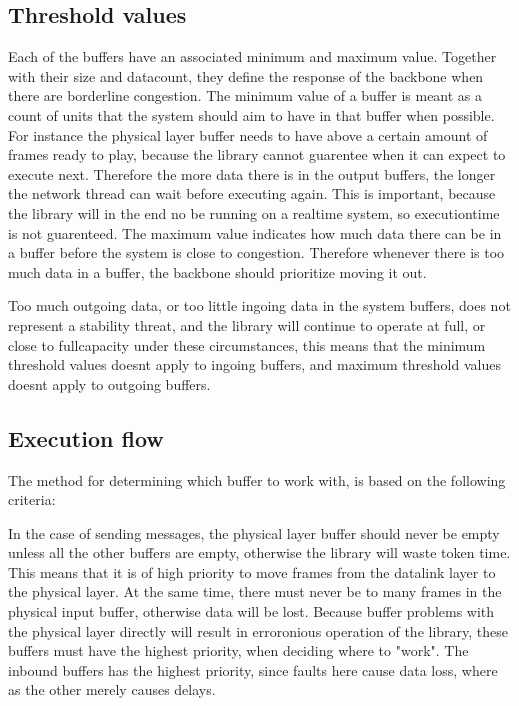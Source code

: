 \subsection{Threshold values}
Each of the buffers have an associated minimum and maximum value. Together with their size and datacount, they define the response of the backbone when there are borderline congestion.
The minimum value of a buffer is meant as a count of units that the system should aim to have in that buffer when possible. For instance the physical layer buffer needs to have above a certain amount of frames ready to play, because the library cannot guarentee when it can expect to execute next. Therefore the more data there is in the output buffers, the longer the network thread can wait before executing again. This is important, because the library will in the end no be running on a realtime system, so executiontime is not guarenteed.
The maximum value indicates how much data there can be in a buffer before the system is close to congestion. Therefore whenever there is too much data in a buffer, the backbone should prioritize moving it out.


Too much outgoing data, or too little ingoing data in the system buffers, does not represent a stability threat, and the library will continue to operate at full, or close to fullcapacity under these circumstances, this means that the minimum threshold values doesnt apply to ingoing buffers, and maximum threshold values doesnt apply to outgoing buffers.


\subsection{Execution flow}
The method for determining which buffer to work with, is based on the following criteria:

In the case of sending messages, the physical layer buffer should never be empty unless all the other buffers are empty, otherwise the library will waste token time. This means that it is of high priority to move frames from the datalink layer to the physical layer.
At the same time, there must never be to many frames in the physical input buffer, otherwise data will be lost. Because buffer problems with the physical layer directly will result in erroronious operation of the library, these buffers must have the highest priority, when deciding where to "work". The inbound buffers has the highest priority, since faults here cause data loss, where as the other merely causes delays.

